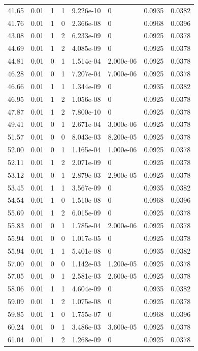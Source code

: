 \documentclass[preview]{standalone}
\begin{document}
{{{\begin{tabular}{L{1.2cm}C{1.2cm} C{0.3cm}C{0.5cm} C{1.4cm}C{1.4cm} C{1.4cm}C{1.4cm}}
  41.65  &  0.01  & 1     &  1 &  9.226e-10  & 0  & 0.0935 &  0.0382   \\ 
  41.76  &  0.01  & 1     &  0 &  2.366e-08  & 0  & 0.0968 &  0.0396   \\ 
  43.08  &  0.01  & 1     &  2 &  6.233e-09  & 0  & 0.0925 &  0.0378   \\ 
  44.69  &  0.01  & 1     &  2 &  4.085e-09  & 0  & 0.0925 &  0.0378   \\ 
  44.81  &  0.01  & 0     &  1 &  1.514e-04  & 2.000e-06  & 0.0925 &  0.0378   \\ 
  46.28  &  0.01  & 0     &  1 &  7.207e-04  & 7.000e-06  & 0.0925 &  0.0378   \\ 
  46.66  &  0.01  & 1     &  1 &  1.344e-09  & 0  & 0.0935 &  0.0382   \\ 
  46.95  &  0.01  & 1     &  2 &  1.056e-08  & 0  & 0.0925 &  0.0378   \\ 
  47.87  &  0.01  & 1     &  2 &  7.800e-10  & 0  & 0.0925 &  0.0378   \\ 
  49.41  &  0.01  & 0     &  1 &  2.671e-04  & 3.000e-06  & 0.0925 &  0.0378   \\ 
  51.57  &  0.01  & 0     &  0 &  8.043e-03  & 8.200e-05  & 0.0925 &  0.0378   \\ 
  52.00  &  0.01  & 0     &  1 &  1.165e-04  & 1.000e-06  & 0.0925 &  0.0378   \\ 
  52.11  &  0.01  & 1     &  2 &  2.071e-09  & 0  & 0.0925 &  0.0378   \\ 
  53.12  &  0.01  & 0     &  1 &  2.879e-03  & 2.900e-05  & 0.0925 &  0.0378   \\ 
  53.45  &  0.01  & 1     &  1 &  3.567e-09  & 0  & 0.0935 &  0.0382   \\ 
  54.54  &  0.01  & 1     &  0 &  1.510e-08  & 0  & 0.0968 &  0.0396   \\ 
  55.69  &  0.01  & 1     &  2 &  6.015e-09  & 0  & 0.0925 &  0.0378   \\ 
  55.83  &  0.01  & 0     &  1 &  1.785e-04  & 2.000e-06  & 0.0925 &  0.0378   \\ 
  55.94  &  0.01  & 0     &  0 &  1.017e-05  & 0  & 0.0925 &  0.0378   \\ 
  55.94  &  0.01  & 1     &  1 &  5.401e-08  & 0  & 0.0935 &  0.0382   \\ 
  57.00  &  0.01  & 0     &  0 &  1.142e-03  & 1.200e-05  & 0.0925 &  0.0378   \\ 
  57.05  &  0.01  & 0     &  1 &  2.581e-03  & 2.600e-05  & 0.0925 &  0.0378   \\ 
  58.06  &  0.01  & 1     &  1 &  4.604e-09  & 0  & 0.0935 &  0.0382   \\ 
  59.09  &  0.01  & 1     &  2 &  1.075e-08  & 0  & 0.0925 &  0.0378   \\ 
  59.85  &  0.01  & 1     &  0 &  1.755e-07  & 0  & 0.0968 &  0.0396   \\ 
  60.24  &  0.01  & 0     &  1 &  3.486e-03  & 3.600e-05  & 0.0925 &  0.0378   \\ 
  61.04  &  0.01  & 1     &  2 &  1.268e-09  & 0  & 0.0925 &  0.0378   \\ 
\hline 
\end{tabular} 

}}}
\end{document}
